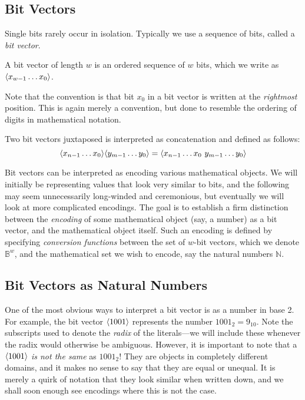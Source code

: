 \subsection{Bit Vectors}

Single bits rarely occur in isolation.  Typically we use a sequence of
bits, called a \emph{bit vector}.

\begin{definition}
  A bit vector of length $w$ is an ordered sequence of $w$ bits, which
  we write as $\langle x_{w-1}\ldots{}x_{0} \rangle$.
\end{definition}

Note that the convention is that bit $x_{0}$ in a bit vector is
written at the \emph{rightmost} position.  This is again merely a
convention, but done to resemble the ordering of digits in
mathematical notation.

\begin{definition}
  Two bit vectors juxtaposed is interpreted as concatenation and
  defined as follows:
  \[
    \langle x_{n-1}\ldots{}x_{0} \rangle \langle y_{m-1}\ldots{}y_{0} \rangle
    = \langle x_{n-1}\ldots{}x_{0}~y_{m-1}\ldots{}y_{0} \rangle
  \]
\end{definition}


Bit vectors can be interpreted as encoding various mathematical
objects.  We will initially be representing values that look very
similar to bits, and the following may seem unnecessarily long-winded
and ceremonious, but eventually we will look at more complicated
encodings.  The goal is to establish a firm distinction between the
\emph{encoding} of some mathematical object (say, a number) as a bit
vector, and the mathematical object itself.  Such an encoding is
defined by specifying \emph{conversion functions} between the set of
$w$-bit vectors, which we denote $\mathbb{B}^{w}$, and the
mathematical set we wish to encode, say the natural numbers
$\mathbb{N}$.

\subsection{Bit Vectors as Natural Numbers}
\label{sec:bitnats}

One of the most obvious ways to interpret a bit vector is as a number
in base 2.  For example, the bit vector $\langle 1001 \rangle$ represents
the number $1001_{2} = 9_{10}$.  Note the subscripts used to denote
the \emph{radix} of the literals---we will include these whenever the
radix would otherwise be ambiguous.  However, it is important to note
that a $\langle 1001 \rangle$ \emph{is not the same} as $1001_{2}$!  They
are objects in completely different domains, and it makes no sense to
say that they are equal or unequal.  It is merely a quirk of notation
that they look similar when written down, and we shall soon enough see
encodings where this is not the case.

